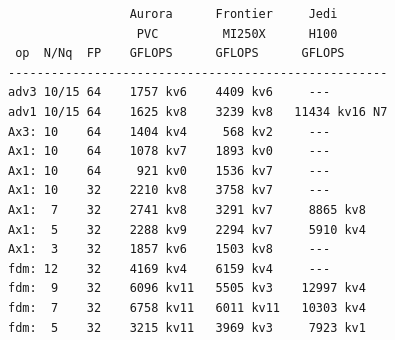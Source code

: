 
\begin{table} %
\noindent
\begin{minipage}[t]{3.4in}
\scriptsize \begin{verbatim}
                 Aurora      Frontier     Jedi
                  PVC         MI250X      H100
 op  N/Nq  FP    GFLOPS      GFLOPS      GFLOPS
-----------------------------------------------------
adv3 10/15 64    1757 kv6    4409 kv6     ---
adv1 10/15 64    1625 kv8    3239 kv8   11434 kv16 N7
Ax3: 10    64    1404 kv4     568 kv2     ---
Ax1: 10    64    1078 kv7    1893 kv0     ---
Ax1: 10    64     921 kv0    1536 kv7     ---
Ax1: 10    32    2210 kv8    3758 kv7     ---
Ax1:  7    32    2741 kv8    3291 kv7     8865 kv8
Ax1:  5    32    2288 kv9    2294 kv7     5910 kv4
Ax1:  3    32    1857 kv6    1503 kv8     ---
fdm: 12    32    4169 kv4    6159 kv4     ---
fdm:  9    32    6096 kv11   5505 kv3    12997 kv4
fdm:  7    32    6758 kv11   6011 kv11   10303 kv4
fdm:  5    32    3215 kv11   3969 kv3     7923 kv1
\end{verbatim}
\normalsize
\end{minipage}
\normalsize
\caption{\label{tab:log0}
Typical NekRS kernel per-rank timing data printed to a logfile during the kernel
selection step: operator ({\tt adv, Ax, fdm}) identifed on the left, followed by
polynomial/quadrature order, precision, GFLOPS, and kernel version (kv).
}
\end{table}


